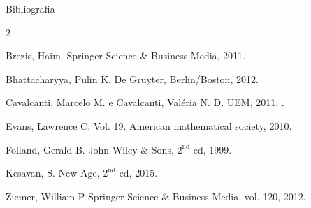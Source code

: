 
\begin{frame}{Bibliografia}
	\begin{scriptsize}
	
	
		\begin{block}{ }
		\begin{multicols}{2}
			
		\begin{thebibliography}{}
				\beamertemplatebookbibitems
Brezis, Haim.
\newblock Springer Science \& Business Media, 2011.

Bhattacharyya, Pulin K.
\newblock De Gruyter, Berlin/Boston, 2012. 

Cavalcanti, Marcelo M. e Cavalcanti, Valéria N. D.
\newblock UEM, 2011.
\href{https://www.researchgate.net/publication/338213476_Cavalcanti_Marcelo_Moreira_Domingos_Cavalcanti_Valeria_Neves_Introducao_a_teoria_das_distribuicoes_e_aos_espacos_de_Sobolev_Portuguese_Introduction_to_distribution_theory_and_Sobolev_spaces_Editora_da}{}.

Evans, Lawrence C.
\newblock Vol. 19. American mathematical society, 2010. 

Folland, Gerald B.
\newblock John Wiley \& Sons,  $2^\text{nd}$ ed, 1999. 

Kesavan, S.
\newblock New Age,  $2^\text{nd}$ ed, 2015. 

		
Ziemer, William P
\newblock Springer Science \& Business Media,  vol. 120, 2012.
					
				
					
				\end{thebibliography}
		\end{multicols}
			\end{block}
			
		\end{scriptsize}
	\end{frame}


